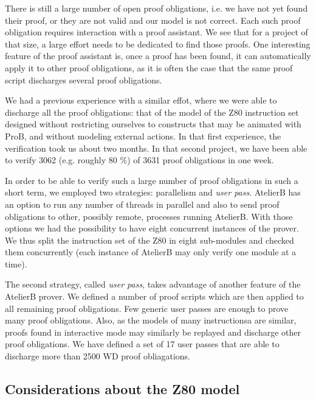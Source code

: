 \documentclass[a4paper]{llncs}
\begin{document}


There is still a large number of open proof obligations, i.e. we have
not yet found their proof, or they are not valid and our model is not
correct. Each such proof obligation requires interaction with a proof
assistant. We see that for a project of that size, a large effort
needs to be dedicated to find those proofs. One interesting feature of
the proof assistant is, once a proof has been found, it can
automatically apply it to other proof obligations, as it is often the
case that the same proof script discharges several proof obligations.

We had a previous experience with a similar effot, where we were able
to discharge all the proof obligations: that of the model of the Z80
instruction set designed without restricting ourselves to constructs
that may be animated with ProB, and without modeling external actions.
In that first experience, the verification took us about two months. In that second
project, we have been able to verify 3062 (e.g. roughly 80 \%) of 3631
proof obligations in one week.

In order to be able to verify such a large number of proof obligations
in such a short term, we employed two strategies: parallelism and
\emph{user pass}. AtelierB has an option to run any number of threads
in parallel and also to send proof obligations to other, possibly
remote, processes running AtelierB. With those options we had the
possibility to have eight concurrent instances of the prover. We thus
split the instruction set of the Z80 in eight sub-modules and checked
them concurrently (each instance of AtelierB may only verify one module
at a time).  

The second strategy, called \emph{user pass}, takes advantage of
another feature of the AtelierB prover. We defined a number of proof
scripts which are then applied to all remaining proof obligations. Few
generic user passes are enough to prove many proof obligations. Also,
as the models of many instructionsa are similar, proofs found in
interactive mode may similarly be replayed and discharge other proof
obligations. We have defined a set of 17 user passes that are able
to discharge more than 2500 WD proof obliagations.


\subsection{Considerations about the Z80 model}
\end{document}

